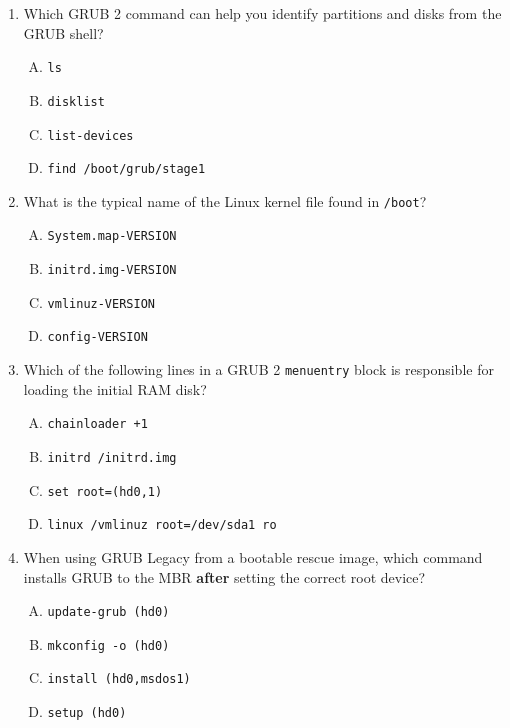 \documentclass[a4paper]{report}
\begin{document}
\begin{enumerate}[1.]
    \item Which GRUB 2 command can help you identify partitions and disks from the GRUB shell?  
    \begin{enumerate}[A)]
        \item \texttt{ls}  
        \item \texttt{disklist}  
        \item \texttt{list-devices}  
        \item \texttt{find /boot/grub/stage1}  
    \end{enumerate}

    \item What is the typical name of the Linux kernel file found in \texttt{/boot}?  
    \begin{enumerate}[A)]
        \item \texttt{System.map-VERSION}  
        \item \texttt{initrd.img-VERSION}  
        \item \texttt{vmlinuz-VERSION}  
        \item \texttt{config-VERSION}  
    \end{enumerate}

    \item Which of the following lines in a GRUB 2 \texttt{menuentry} block is responsible for loading the initial RAM disk?  
    \begin{enumerate}[A)]
        \item \texttt{chainloader +1}  
        \item \texttt{initrd /initrd.img}  
        \item \texttt{set root=(hd0,1)}  
        \item \texttt{linux /vmlinuz root=/dev/sda1 ro}  
    \end{enumerate}

    \item When using GRUB Legacy from a bootable rescue image, which command installs GRUB to the MBR \textbf{after} setting the correct root device?  
    \begin{enumerate}[A)]
        \item \texttt{update-grub (hd0)}  
        \item \texttt{mkconfig -o (hd0)}  
        \item \texttt{install (hd0,msdos1)}  
        \item \texttt{setup (hd0)}  
    \end{enumerate}


\end{enumerate}
\end{document}
